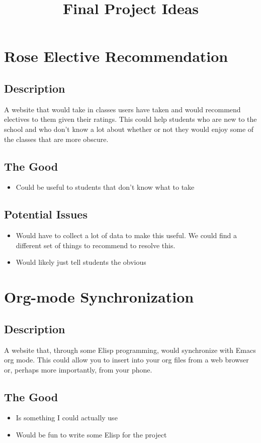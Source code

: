 \documentclass{article}
\title{Final Project Ideas}
\begin{document}
\section{Rose Elective Recommendation}
\subsection*{Description}
A website that would take in classes users have taken and would recommend
electives to them given their ratings. This could help students who are new to
the school and who don't know a lot about whether or not they would enjoy some
of the classes that are more obscure.
\subsection*{The Good}
\begin{itemize}
\item
  Could be useful to students that don't know what to take
\end{itemize}
\subsection*{Potential Issues}
\begin{itemize}
\item
  Would have to collect a lot of data to make this useful. We could find a
  different set of things to recommend to resolve this.
\item
  Would likely just tell students the obvious
\end{itemize}


\section{Org-mode Synchronization}
\subsection*{Description}
A website that, through some Elisp programming, would synchronize with Emacs
org mode. This could allow you to insert into your org files from a web browser
or, perhaps more importantly, from your phone. 
\subsection*{The Good}
\begin{itemize}
\item
  Is something I could actually use
\item
  Would be fun to write some Elisp for the project
\end{itemize}
\end{document}
